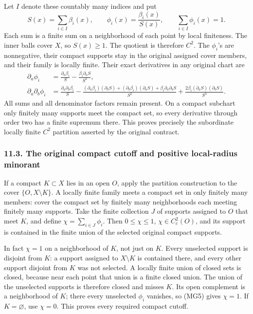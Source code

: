\documentclass[
  11pt,
]{article}
\begin{document}
Let \(I\) denote these countably many indices and put \[
 S(x)=\sum_{i\in I}\beta_i(x),\qquad
 \phi_i(x)=\frac{\beta_i(x)}{S(x)},\qquad
 \sum_{i\in I}\phi_i(x)=1 .
                                                               \tag{MG5}
\] Each sum is a finite sum on a neighborhood of each point by local
finiteness. The inner balls cover \(X\), so \(S(x)\geq1\). The quotient
is therefore \(C^2\). The \(\phi_i\)'s are nonnegative, their compact
supports stay in the original assigned cover members, and their family
is locally finite. Their exact derivatives in any original chart are \[
 \begin{split}
 \partial_a\phi_i
 &=\frac{\partial_a\beta_i}{S}
       -\frac{\beta_i\partial_aS}{S^2},\\
 \partial_a\partial_b\phi_i
 &=\frac{\partial_a\partial_b\beta_i}{S}
 -\frac{(\partial_a\beta_i)(\partial_bS)
        +(\partial_b\beta_i)(\partial_aS)
        +\beta_i\partial_a\partial_bS}{S^2}
 +\frac{2\beta_i(\partial_aS)(\partial_bS)}{S^3}.
 \end{split}                                                   \tag{MG6}
\] All sums and all denominator factors remain present. On a compact
subchart only finitely many supports meet the compact set, so every
derivative through order two has a finite supremum there. This proves
precisely the subordinate locally finite \(C^2\) partition asserted by
the original contract.

\subsubsection{11.3. The original compact cutoff and positive
local-radius
minorant}\label{the-original-compact-cutoff-and-positive-local-radius-minorant}

If a compact \(K\subset X\) lies in an open \(O\), apply the partition
construction to the cover \(\{O,X\setminus K\}\). A locally finite
family meets a compact set in only finitely many members: cover the
compact set by finitely many neighborhoods each meeting finitely many
supports. Take the finite collection \(J\) of supports assigned to \(O\)
that meet \(K\), and define \(\chi=\sum_{i\in J}\phi_i\). Then
\(0\leq\chi\leq1\), \(\chi\in C_c^2(O)\), and its support is contained
in the finite union of the selected original compact supports.

In fact \(\chi=1\) on a neighborhood of \(K\), not just on \(K\). Every
unselected support is disjoint from \(K\): a support assigned to
\(X\setminus K\) is contained there, and every other support disjoint
from \(K\) was not selected. A locally finite union of closed sets is
closed, because near each point that union is a finite closed union. The
union of the unselected supports is therefore closed and misses \(K\).
Its open complement is a neighborhood of \(K\); there every unselected
\(\phi_i\) vanishes, so (MG5) gives \(\chi=1\). If \(K=\varnothing\),
use \(\chi=0\). This proves every required compact cutoff.
\end{document}
